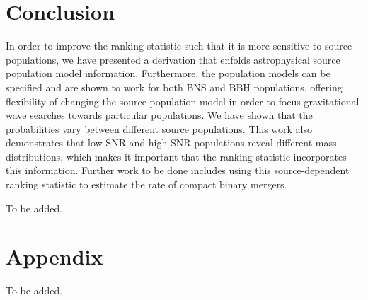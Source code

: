 \documentclass[twocolumn,showpacs,unsortedaddress,superscriptaddress,showkeys,nofootinbib,preprintnumbers,letterpaper]{revtex4-1}
\begin{document}

\section{Conclusion} \label{sec:conclusion}

In order to improve the ranking statistic such that it is more sensitive to source populations, we have presented a derivation that enfolds astrophysical source population model information. Furthermore, the population models can be specified and are shown to work for both BNS and BBH populations, offering flexibility of changing the source population model in order to focus gravitational-wave searches towards particular populations. We have shown that the probabilities vary between different source populations. This work also demonstrates that low-SNR and high-SNR populations reveal different mass distributions, which makes it important that the ranking statistic incorporates this information. Further work to be done includes using this source-dependent ranking statistic to estimate the rate of compact binary mergers.

\acknowledgments

To be added.

\appendix

\section{Appendix}
\label{appendix2}

To be added.


\end{document}

